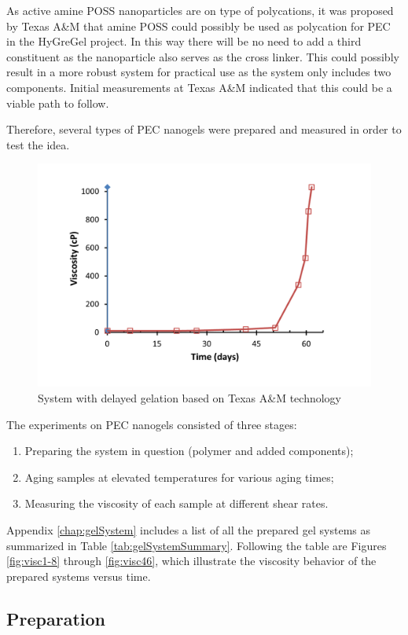 As active amine POSS  nanoparticles are on type of polycations, it was proposed by Texas A\&M that amine POSS could possibly be used as polycation for PEC in the HyGreGel project. In this way there will be no need to add a third constituent as the nanoparticle also serves as the cross linker. This could possibly result in a more robust system for practical use as the system only includes two components. Initial measurements at Texas A\&M indicated that this could be a viable path to follow.

Therefore, several types of PEC nanogels were prepared and measured in order to test the idea.

\begin{figure}
    \centering
    \includegraphics[width=.75\textwidth]{img/cht/jennTai.png}
    \caption{System with delayed gelation based on Texas A\&M technology \citep{Cordova2008}}
    \label{cht:jennTai}
\end{figure}

\newpage
The experiments on PEC nanogels consisted of three stages:
\begin{enumerate}
    \item Preparing the system in question (polymer and added components);
    \item Aging samples at elevated temperatures for various aging times;
    \item Measuring the viscosity of each sample at different shear rates.
\end{enumerate}

Appendix \ref{chap:gelSystem} includes a list of all the prepared gel systems as summarized in Table \ref{tab:gelSystemSummary}. Following the table are Figures \ref{fig:visc1-8} through \ref{fig:visc46}, which illustrate the viscosity behavior of the prepared systems versus time. 

\subsection{Preparation}

